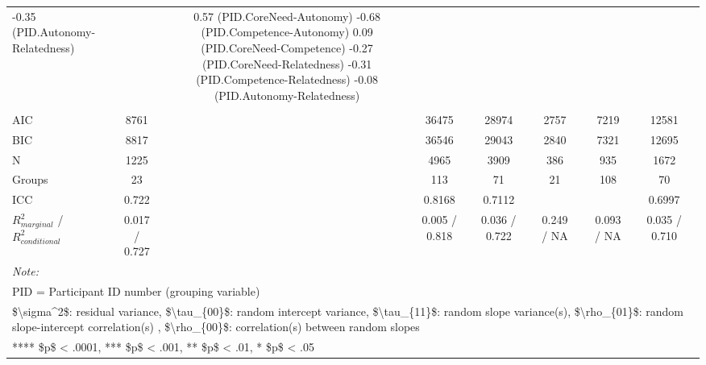 \begin{table}
\begin{minipage}[t][\textheight][t]{\textwidth}
\begin{tabular}[t]{lcccccccccccc}
-0.35 (PID.Autonomy-Relatedness) &  & 0.57 (PID.CoreNeed-Autonomy)
-0.68 (PID.Competence-Autonomy)
 0.09 (PID.CoreNeed-Competence)
-0.27 (PID.CoreNeed-Relatedness)
-0.31 (PID.Competence-Relatedness)
\hspace{1em}-0.08 (PID.Autonomy-Relatedness) & \\
\addlinespace[0.3em]
\multicolumn{13}{l}{\textbf{Fit}}\\
\hspace{1em}AIC & 8761 &  & 36475 &  & 28974 &  & 2757 &  & 7219 &  & 12581 & \\
\hspace{1em}BIC & 8817 &  & 36546 &  & 29043 &  & 2840 &  & 7321 &  & 12695 & \\
\hspace{1em}N & 1225 &  & 4965 &  & 3909 &  & 386 &  & 935 &  & 1672 & \\
\hspace{1em}Groups & 23 &  & 113 &  & 71 &  & 21 &  & 108 &  & 70 & \\
\hspace{1em}ICC & 0.722 &  & 0.8168 &  & 0.7112 &  &  &  &  &  & 0.6997 & \\
\hspace{1em}$R^2_{marginal}$ / $R^2_{conditional}$ & 0.017 / 0.727 &  & 0.005 / 0.818 &  & 0.036 / 0.722 &  & 0.249 / NA &  & 0.093 / NA &  & 0.035 / 0.710 & \\
\bottomrule
\multicolumn{13}{l}{\rule{0pt}{1em}\textit{Note: }}\\
\multicolumn{13}{l}{\rule{0pt}{1em}PID = Participant ID number (grouping variable)}\\
\multicolumn{13}{l}{\rule{0pt}{1em}\$\textbackslash{}sigma\textasciicircum{}2\$: residual variance, \$\textbackslash{}tau\_\{00\}\$: random intercept variance, \$\textbackslash{}tau\_\{11\}\$: random slope variance(s), \$\textbackslash{}rho\_\{01\}\$: random slope-intercept correlation(s) , \$\textbackslash{}rho\_\{00\}\$: correlation(s) between random slopes}\\
\multicolumn{13}{l}{\rule{0pt}{1em}**** \$p\$ < .0001, *** \$p\$ < .001, ** \$p\$ < .01, * \$p\$ < .05}\\
\end{tabular}
\end{minipage}
\end{table}
